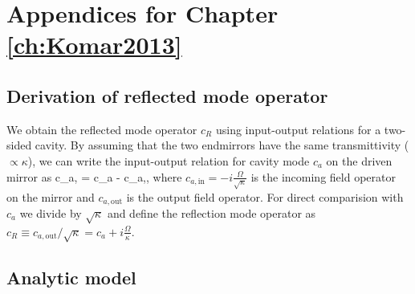 \chapter{Appendices for Chapter \ref{ch:Komar2013}}
\label{app:Komar2013}

\section{Derivation of reflected mode operator}
\label{App: Reflection}

We obtain the reflected mode operator $c_R$ using input-output
relations for a two-sided cavity. 
By assuming that the two endmirrors have
the same transmittivity ($\propto\kappa$), we can write the input-output
relation for cavity mode $c_a$ on the driven mirror as
\bel
	c_{a,} =
	\sqrt{\kappa}c_a - c_{a,},
\eel
where $c_{a,\text{in}} = -i\frac{\Omega}{\sqrt{\kappa}}$ is the incoming field
operator on the mirror and $c_{a,\text{out}}$ is the output field operator.
For direct comparision with $c_a$ we
divide by $\sqrt{\kappa}$ and define the
reflection mode operator as  
$c_R \equiv c_{a,\text{out}}/\sqrt{\kappa} =
c_a +i\frac{\Omega}{\kappa}$.


\section{Analytic model}
\label{sect:App:steady_state}




